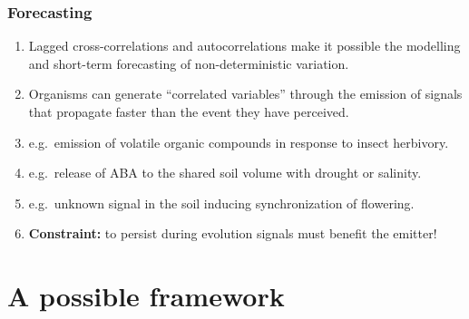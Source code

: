 \documentclass[10pt]{beamer}\usepackage[]{graphicx}\usepackage[]{xcolor}
\begin{document}
\begin{frame}%
\frametitle{Forecasting}
\begin{enumerate}
  \item Lagged cross-correlations and autocorrelations make it possible the modelling and short-term forecasting of non-deterministic variation.
  \item Organisms can generate ``correlated variables'' through the emission of signals that propagate faster than the event they have perceived.
  \item e.g.\ emission of volatile organic compounds in response to insect herbivory.
  \item e.g.\ release of ABA to the shared soil volume with drought or salinity.
  \item e.g.\ unknown signal in the soil inducing synchronization of flowering.
  \item \textbf{Constraint:} to persist during evolution signals must benefit the emitter!
\end{enumerate}
\end{frame}

\section{A possible framework}
\end{document}
